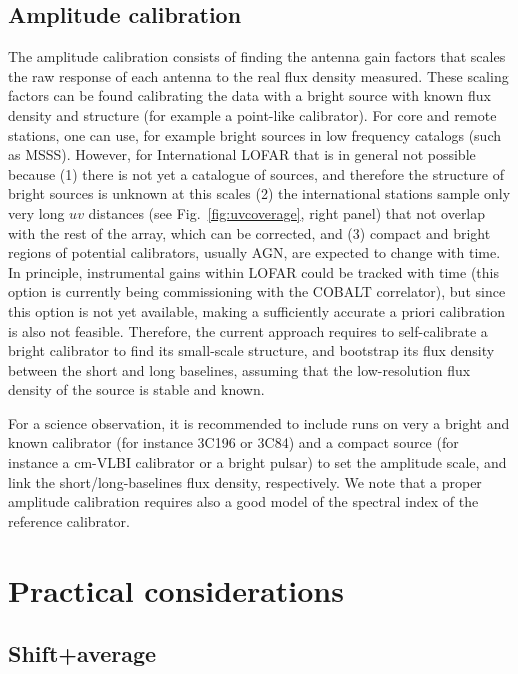 \documentclass[graybox]{svmult}
\begin{document}
\subsection{Amplitude calibration}

The amplitude calibration consists of finding the antenna gain factors
that scales the raw response of each antenna to the real flux density measured.
These scaling factors can be found calibrating the data with a bright source
with known flux density and structure (for example a point-like calibrator).
For core and remote stations, one can use, for example bright sources in low
frequency catalogs (such as MSSS). However, for International LOFAR that is in
general not possible because (1) there is not yet a catalogue of sources, and
therefore the structure of bright sources is unknown at this scales (2) the
international stations sample only very long $uv$ distances (see
Fig.~\ref{fig:uvcoverage}, right panel) that not overlap with the rest of the
array, which can be corrected, and (3) compact and bright regions of potential
calibrators, usually AGN, are expected to change with time. In principle,
instrumental gains within LOFAR could be tracked with time (this option is
currently being commissioning with the COBALT correlator), but since this
option is not yet available, making a sufficiently  accurate a priori
calibration is also not feasible. Therefore, the current approach requires to
self-calibrate a bright calibrator to find its small-scale structure, and
bootstrap its flux density between the short and long baselines, assuming that
the low-resolution flux density of the source is stable and known. 

For a science observation, it is recommended to include runs on very a bright
and known calibrator (for instance 3C196 or 3C84) and a compact source
(for instance a cm-VLBI calibrator or a bright pulsar) to set the amplitude
scale, and link the short/long-baselines flux density, respectively. We
note that a proper amplitude calibration requires also a good model of the
spectral index of the reference calibrator.  

\section{Practical considerations}
\label{sec:practical}

\subsection{Shift+average}\label{sec:shift}
\end{document}
